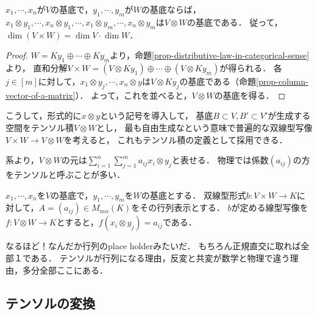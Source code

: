 \documentclass[uplatex, dvipdfmx]{jsreport}
\begin{document}
\begin{corollary}[テンソル空間の基底は基底のテンソル積]\label{cor-the-basis-of-tensor-product}
    $x_1,\cdots,x_n$が$V$の基底で，$y_1,\cdots,y_m$が$W$の基底ならば，$x_1\otimes y_1,\cdots,x_n\otimes y_1,\cdots,x_1\otimes y_m,\cdots,x_n\otimes y_m$は$V\otimes W$の基底である．
    従って，$\dim(V\times W)=\dim V\cdot\dim W$．
\end{corollary}
\begin{proof}
    $W=Ky_1\oplus\cdots\oplus Ky_m$より，命題\ref{prop-distributive-law-in-categorical-sense}より，
    直和分解$V\times W=(V\otimes Ky_1)\oplus\cdots\oplus(V\otimes Ky_m)$が得られる．
    各$j\in[m]$に対して，$x_1\otimes y_j,\cdots,x_n\otimes y$は$V\otimes Ky_j$の基底である（命題\ref{prop-column-vector-of-a-matrix}）．
    よって，これを並べると，$V\otimes W$の基底を得る．
\end{proof}
\begin{remarks}[普遍の語の由来]
    こうして，形式的に$x\otimes y$という記号を導入して，
    基底$B\subset V,B'\subset V'$が生成する空間をテンソル積$V\otimes W$とし，
    最も自由生成なという意味で普遍的な双線型写像$V\times W\to V\otimes W$を考えると，
    これもテンソル積の定義として採用できる．
\end{remarks}

\begin{remark}[数学と物理でのテンソル]
    系より，$V\otimes W$の元は$\sum^n_{i=1}\sum^m_{j=1}a_{ij}x_i\otimes y_j$と表せる．
    物理では係数$(a_{ij})$の方をテンソルと呼ぶことが多い．
\end{remark}

\begin{example}[双線型形式の定める線型写像]
    $x_1,\cdots,x_n$を$V$の基底で，$y_1,\cdots,y_m$を$W$の基底とする．
    双線型形式$b:V\times W\to K$に対して，$A=(a_{ij})\in M_{mn}(K)$をその行列表示とする．
    $b$が定める線型写像を$f:V\otimes W\to K$とすると，$f(x_i\otimes y_j)=a_{ij}$である．
\end{example}
\begin{remarks}
    なるほど！なんだか行列のplace holderみたいだ．
    もちろん正規直交に取れば全部１である．
    テンソルが行列になる理由，反変と共変が数学と物理で違う理由，多分全部ここにある．
\end{remarks}

\subsection{テンソルの変換}
\end{document}
